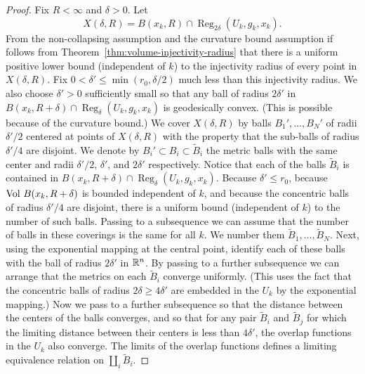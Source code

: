 \begin{proof}
\sketch
{}
Fix $R<\infty$ and $\delta>0$. Let
$$X(\delta,R)=B(x_k,R)\cap
\operatorname{Reg}_{2\delta}(U_k,g_k,x_k).$$
 From the non-collapsing assumption
and the curvature bound assumption if follows from
Theorem~\ref{thm:volume-injectivity-radius} that there is a uniform positive lower bound
(independent of $k$) to the injectivity radius of every point in
$X(\delta,R)$. Fix $0<\delta'\le \min(r_0,\delta/2)$ much less
than this injectivity radius. We also choose $\delta'>0$
sufficiently small so that any ball of radius $2\delta'$ in
$B(x_k,R+\delta)\cap \operatorname{Reg}_\delta(U_k,g_k,x_k)$ is geodesically
convex. (This is possible because of the curvature bound.)  We cover
$X(\delta,R)$ by balls $B_1',\ldots,B_N'$
 of radii $\delta'/2$ centered at points of $X(\delta,R)$ with the
property that the sub-balls of radius $\delta'/4$ are disjoint. We
denote by $B_i'\subset B_i\subset \widetilde B_i$ the metric balls
with the same center and radii $\delta'/2$, $\delta'$, and
$2\delta'$ respectively.
 Notice that each of the balls $\widetilde B_i$  is contained in $B(x_k,R+\delta)\cap \operatorname{Reg}_{\delta}(U_k,g_k,x_k)$. Because $\delta'\le r_0$, because $\operatorname{Vol}\,B(x_k,R+\delta)$ is bounded independent of $k$, and because the
concentric balls of radius $\delta'/4$ are disjoint, there is a uniform bound
(independent of $k$) to the number of such balls. Passing to a subsequence we
can assume that the number of balls in these coverings is the same for all $k$.
We number them $\widetilde B_1,\ldots, \widetilde B_N$. Next, using the
exponential mapping at the central point, identify each of these balls with the
ball of radius $2\delta'$ in $\mathbb{R} ^n$. By passing to a further subsequence we
can arrange that the metrics on each $\widetilde B_i$ converge uniformly. (This
uses the fact that the concentric balls of radius $2\delta\ge 4\delta'$ are
embedded in the $U_k$ by the exponential mapping.) Now we pass to a further
subsequence so that the distance between the centers of the balls converges,
and so that for any pair $\widetilde B_i$ and $\widetilde B_j$ for which the
limiting distance between their centers is less than $4\delta'$, the overlap
functions in the $U_k$ also converge. The limits of the overlap functions
defines a limiting equivalence relation on $\coprod_i\widetilde B_i$.


\end{proof}
